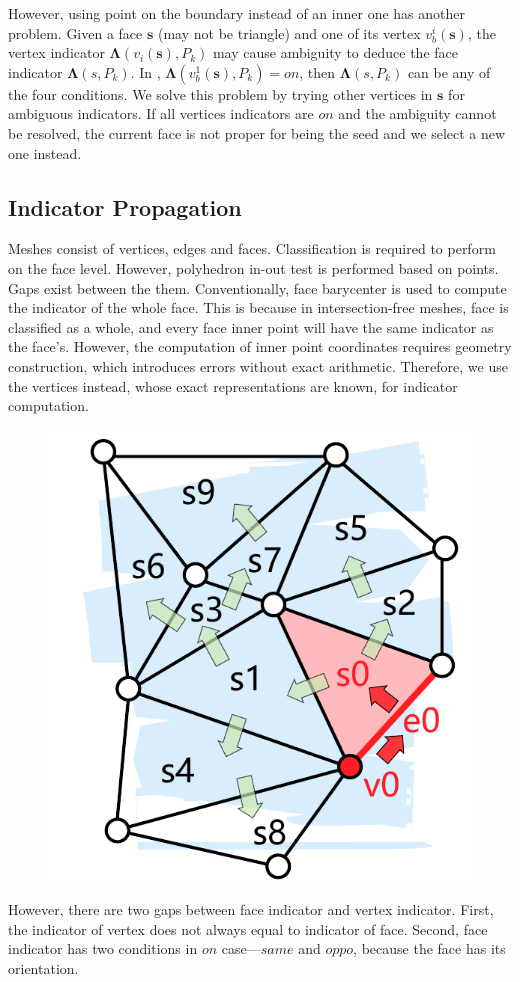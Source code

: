 \documentclass[10pt,journal,compsoc]{IEEEtran}
\begin{document}
However, using point on the boundary instead of an inner one has another problem. Given a face $\bm{s}$ (may not be triangle) and one of its vertex $v_b^i(\bm{s})$, the vertex indicator $\boldsymbol{\Lambda}(v_{i}(\bm{s}), P_k)$ may cause ambiguity to deduce the face indicator $\boldsymbol{\Lambda}(s, P_k)$. In {\color{red}{Fig. ?}}, $\boldsymbol{\Lambda}(v_b^1(\bm{s}), P_k) = on$, then $\boldsymbol{\Lambda}(s, P_k)$ can be any of the four conditions. We solve this problem by trying other vertices in $\bm{s}$ for ambiguous indicators. If all vertices indicators are $on$ and the ambiguity cannot be resolved, the current face is not proper for being the seed and we select a new one instead.

\fi

\subsection{Indicator Propagation}
\label{sec:propagation}


Meshes consist of vertices, edges and faces. Classification is required to perform on the face level. However, polyhedron in-out test is performed based on points. Gaps exist between the them. Conventionally, face barycenter is used to compute the indicator of the whole face. This is because in intersection-free meshes, face is classified as a whole, and every face inner point will have the same indicator as the face's. However, the computation of inner point coordinates requires geometry construction, which introduces errors without exact arithmetic. Therefore, we use the vertices instead, whose exact representations are known, for indicator computation.

\begin{figure}
\includegraphics[width=1.3 in]{propagate}
\end{figure}


However, there are two gaps between face indicator and vertex indicator. First, the indicator of vertex does not always equal to indicator of face. Second, face indicator has two conditions in $on$ case---$same$ and $oppo$, because the face has its orientation.
\end{document}
